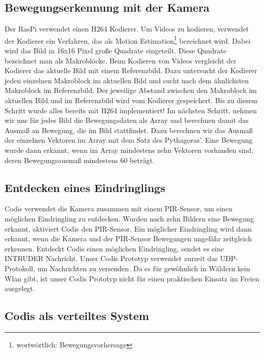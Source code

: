 \documentclass[journal]{IEEEtran}
\begin{document}
\subsection{Bewegungserkennung mit der Kamera}

Der RasPi verwendet einen H264 Kodierer. Um Videos zu kodieren, verwendet der Kodierer ein Verfahren, das als Motion Estimation\footnote{wortwörtlich: Bewegungsvorhersage}\cite{estimation} bezeichnet wird. Dabei wird das Bild in 16x16 Pixel große Quadrate eingeteilt. Diese Quadrate bezeichnet man als Makroblöcke. Beim Kodieren von Videos vergleicht der Kodierer das aktuelle Bild mit einem Referenzbild. Dazu untersucht der Kodierer jeden einzelnen Makroblock im aktuellen Bild und sucht nach dem ähnlichsten Makroblock im Referenzbild. Der jeweilige Abstand zwischen den Makroblock im aktuellen Bild und im Referenzbild wird vom Kodierer gespeichert. Bis zu diesem Schritt wurde alles bereits mit H264 implementiert!\cite{vektoren} Im nächsten Schritt, nehmen wir uns für jedes Bild die Bewegungsdaten als Array und berechnen damit das Ausmaß an Bewegung, die im Bild stattfindet. Dazu berechnen wir das Ausmaß der einzelnen Vektoren im Array mit dem Satz des Pythagoras'. Eine Bewegung wurde dann erkannt, wenn im Array mindestens zehn Vektoren vorhanden sind, deren Bewegungsausmaß mindestens 60 beträgt.

\subsection{Entdecken eines Eindringlings}

Codis verwendet die Kamera zusammen mit einem PIR-Sensor, um einen möglichen Eindringling zu entdecken. Wurden nach zehn Bildern eine Bewegung erkannt, aktiviert Codis den PIR-Sensor. Ein möglicher Eindringling wird dann erkannt, wenn die Kamera und der PIR-Sensor Bewegungen ungefähr zeitgleich erkennen. Entdeckt Codis einen möglichen Eindringling, sendet es eine \MakeUppercase{intruder} Nachricht. Unser Codis Prototyp verwendet zurzeit das UDP-Protokoll, um Nachrichten zu versenden. Da es für gewöhnlich in Wäldern kein Wlan gibt, ist unser Codis Prototyp nicht für einen praktischen Einsatz im Freien ausgelegt.

\subsection{Codis als verteiltes System}
\end{document}
